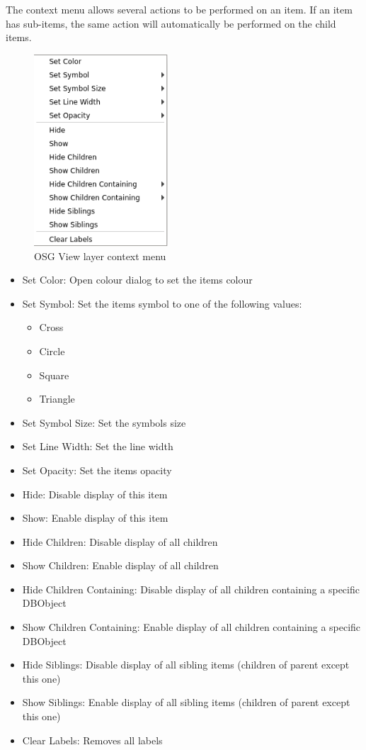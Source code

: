 {The context menu allows several actions to be performed on an item. If an item has sub-items, the same action will automatically be performed on the child items.

\begin{figure}[H]
    \includegraphics[width=5cm,frame]{../screenshots/osgview_layer_context_menu.png}
  \caption{OSG View layer context menu}
\end{figure}

\begin{itemize}
 \item Set Color: Open colour dialog to set the items colour
 \item Set Symbol: Set the items symbol to one of the following values:
\begin{itemize}
 \item Cross
 \item Circle
 \item Square
 \item Triangle
\end{itemize}
 \item Set Symbol Size: Set the symbols size
 \item Set Line Width: Set the line width
 \item Set Opacity: Set the items opacity
 \item Hide: Disable display of this item
 \item Show: Enable display of this item
 \item Hide Children: Disable display of all children
 \item Show Children: Enable display of all children
 \item Hide Children Containing: Disable display of all children containing a specific DBObject
 \item Show Children Containing: Enable display of all children containing a specific DBObject
 \item Hide Siblings: Disable display of all sibling items (children of parent except this one)
 \item Show Siblings: Enable display of all sibling items (children of parent except this one)
 \item Clear Labels: Removes all labels
\end{itemize}

}
